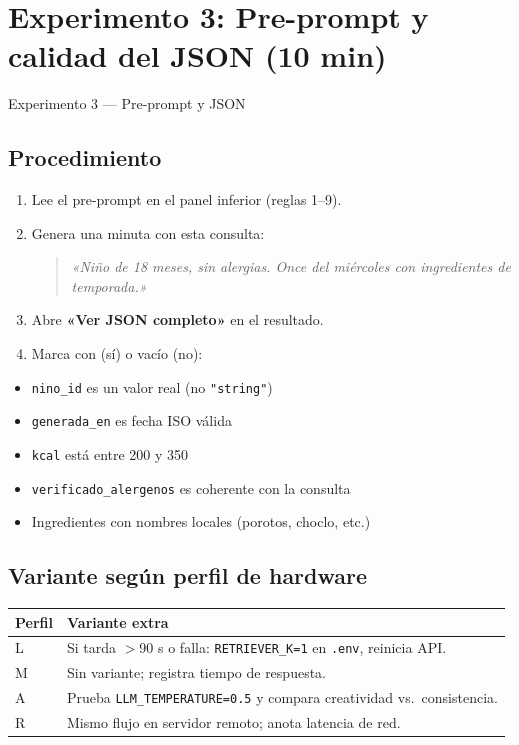 \documentclass[12pt,a4paper]{article}
\newcommand{\checkbox}{\fbox{\rule{0pt}{1.5ex}\rule{1.5ex}{0pt}}}
\begin{document}
\section{Experimento 3: Pre-prompt y calidad del JSON (10 min)}

\begin{experbox}{Experimento 3 --- Pre-prompt y JSON}
\subsection*{Procedimiento}
\begin{enumerate}[noitemsep]
  \item Lee el pre-prompt en el panel inferior (reglas 1--9).
  \item Genera una minuta con esta consulta:
        \begin{quote}
          \textit{«Niño de 18 meses, sin alergias. Once del miércoles con
          ingredientes de temporada.»}
        \end{quote}
  \item Abre \textbf{«Ver JSON completo»} en el resultado.
  \item Marca con \checkbox{} (sí) o vacío (no):
\end{enumerate}

\begin{itemize}[noitemsep]
  \item[\checkbox] \texttt{nino\_id} es un valor real (no \texttt{"string"})
  \item[\checkbox] \texttt{generada\_en} es fecha ISO válida
  \item[\checkbox] \texttt{kcal} está entre 200 y 350
  \item[\checkbox] \texttt{verificado\_alergenos} es coherente con la consulta
  \item[\checkbox] Ingredientes con nombres locales (porotos, choclo, etc.)
\end{itemize}

\subsection*{Variante según perfil de hardware}
\begin{table}[h]
\centering
\small
\begin{tabular}{@{}lp{9.5cm}@{}}
\toprule
\textbf{Perfil} & \textbf{Variante extra} \\
\midrule
L & Si tarda $>$90 s o falla: \texttt{RETRIEVER\_K=1} en \texttt{.env}, reinicia API. \\
M & Sin variante; registra tiempo de respuesta. \\
A & Prueba \texttt{LLM\_TEMPERATURE=0.5} y compara creatividad vs.\ consistencia. \\
R & Mismo flujo en servidor remoto; anota latencia de red. \\
\bottomrule
\end{tabular}
\end{table}


\end{experbox}
\end{document}
